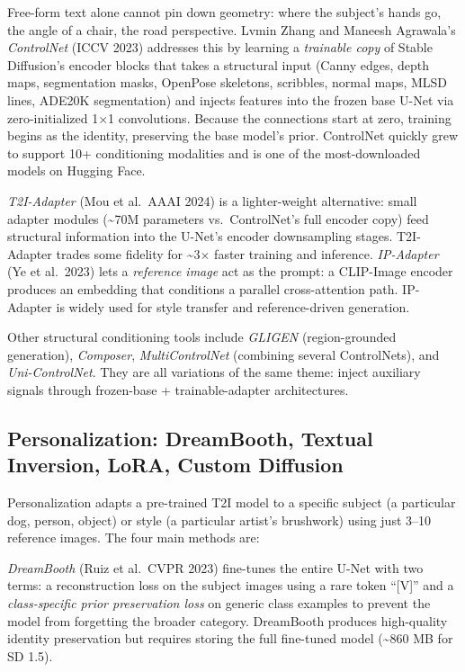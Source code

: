 Free-form text alone cannot pin down geometry: where the subject's hands go, the angle of a chair, the road perspective. Lvmin Zhang and Maneesh Agrawala's \emph{ControlNet} (ICCV 2023) addresses this by learning a \emph{trainable copy} of Stable Diffusion's encoder blocks that takes a structural input (Canny edges, depth maps, segmentation masks, OpenPose skeletons, scribbles, normal maps, MLSD lines, ADE20K segmentation) and injects features into the frozen base U-Net via zero-initialized 1×1 convolutions. Because the connections start at zero, training begins as the identity, preserving the base model's prior. ControlNet quickly grew to support 10+ conditioning modalities and is one of the most-downloaded models on Hugging Face.

\emph{T2I-Adapter} (Mou et al.~AAAI 2024) is a lighter-weight alternative: small adapter modules (\textasciitilde70M parameters vs.~ControlNet's full encoder copy) feed structural information into the U-Net's encoder downsampling stages. T2I-Adapter trades some fidelity for \textasciitilde3× faster training and inference. \emph{IP-Adapter} (Ye et al.~2023) lets a \emph{reference image} act as the prompt: a CLIP-Image encoder produces an embedding that conditions a parallel cross-attention path. IP-Adapter is widely used for style transfer and reference-driven generation.

Other structural conditioning tools include \emph{GLIGEN} (region-grounded generation), \emph{Composer}, \emph{MultiControlNet} (combining several ControlNets), and \emph{Uni-ControlNet}. They are all variations of the same theme: inject auxiliary signals through frozen-base + trainable-adapter architectures.

\subsection{Personalization: DreamBooth, Textual Inversion, LoRA, Custom Diffusion}\label{personalization-dreambooth-textual-inversion-lora-custom-diffusion}

Personalization adapts a pre-trained T2I model to a specific subject (a particular dog, person, object) or style (a particular artist's brushwork) using just 3--10 reference images. The four main methods are:

\emph{DreamBooth} (Ruiz et al.~CVPR 2023) fine-tunes the entire U-Net with two terms: a reconstruction loss on the subject images using a rare token ``{[}V{]}'' and a \emph{class-specific prior preservation loss} on generic class examples to prevent the model from forgetting the broader category. DreamBooth produces high-quality identity preservation but requires storing the full fine-tuned model (\textasciitilde860 MB for SD 1.5).

